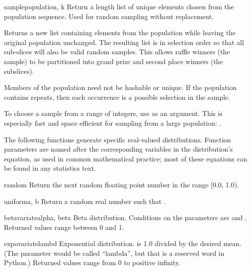 \begin{funcdesc}{sample}{population, k}
  Return a  length list of unique elements chosen from the
  population sequence.  Used for random sampling without replacement.

  Returns a new list containing elements from the population while
  leaving the original population unchanged.  The resulting list is
  in selection order so that all sub-slices will also be valid random
  samples.  This allows raffle winners (the sample) to be partitioned
  into grand prize and second place winners (the subslices).

  Members of the population need not be hashable or unique.  If the
  population contains repeats, then each occurrence is a possible
  selection in the sample.

  To choose a sample from a range of integers, use 
  as an argument.  This is especially fast and space efficient for
  sampling from a large population:  .
\end{funcdesc}


The following functions generate specific real-valued distributions.
Function parameters are named after the corresponding variables in the
distribution's equation, as used in common mathematical practice; most of
these equations can be found in any statistics text.

\begin{funcdesc}{random}{}
  Return the next random floating point number in the range [0.0, 1.0).
\end{funcdesc}

\begin{funcdesc}{uniform}{a, b}
  Return a random real number  such that
  .
\end{funcdesc}

\begin{funcdesc}{betavariate}{alpha, beta}
  Beta distribution.  Conditions on the parameters are
   and .
  Returned values range between 0 and 1.
\end{funcdesc}

\begin{funcdesc}{expovariate}{lambd}
  Exponential distribution.   is 1.0 divided by the desired
  mean.  (The parameter would be called ``lambda'', but that is a
  reserved word in Python.)  Returned values range from 0 to
  positive infinity.
\end{funcdesc}

